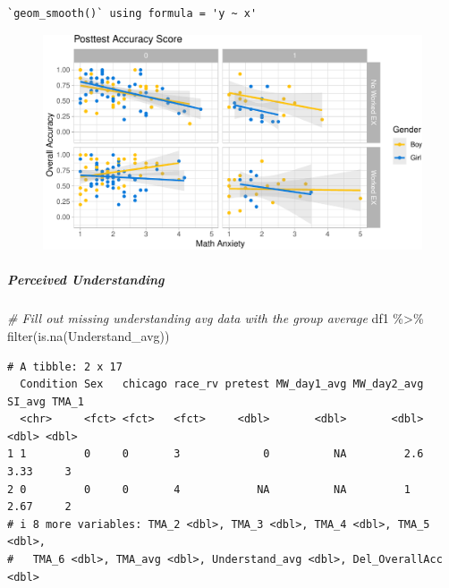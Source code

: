 \documentclass[
  letterpaper,
  DIV=11,
  numbers=noendperiod]{scrartcl}
\let\oldsubparagraph\subparagraph
\renewcommand{\subparagraph}[1]{\oldsubparagraph{#1}\mbox{}}
\newenvironment{Shaded}{\begin{snugshade}}{\end{snugshade}}
\newcommand{\CommentTok}[1]{\textcolor[rgb]{0.38,0.63,0.69}{\textit{#1}}}
\newcommand{\FunctionTok}[1]{\textcolor[rgb]{0.02,0.16,0.49}{#1}}
\newcommand{\NormalTok}[1]{\textcolor[rgb]{0.00,0.44,0.13}{#1}}
\newcommand{\SpecialCharTok}[1]{\textcolor[rgb]{0.25,0.44,0.63}{#1}}
\begin{document}
\begin{verbatim}
`geom_smooth()` using formula = 'y ~ x'
\end{verbatim}

\begin{figure}[H]

{\centering \includegraphics{sampling_files/figure-pdf/unnamed-chunk-18-1.pdf}

}

\end{figure}

\hypertarget{perceived-understanding}{%
\subparagraph{Perceived Understanding}\label{perceived-understanding}}

\begin{Shaded}
\begin{Highlighting}[]
\CommentTok{\# Fill out missing understanding avg data with the group average}
\NormalTok{df1 }\SpecialCharTok{\%\textgreater{}\%} \FunctionTok{filter}\NormalTok{(}\FunctionTok{is.na}\NormalTok{(Understand\_avg))}
\end{Highlighting}
\end{Shaded}

\begin{verbatim}
# A tibble: 2 x 17
  Condition Sex   chicago race_rv pretest MW_day1_avg MW_day2_avg SI_avg TMA_1
  <chr>     <fct> <fct>   <fct>     <dbl>       <dbl>       <dbl>  <dbl> <dbl>
1 1         0     0       3             0          NA         2.6   3.33     3
2 0         0     0       4            NA          NA         1     2.67     2
# i 8 more variables: TMA_2 <dbl>, TMA_3 <dbl>, TMA_4 <dbl>, TMA_5 <dbl>,
#   TMA_6 <dbl>, TMA_avg <dbl>, Understand_avg <dbl>, Del_OverallAcc <dbl>
\end{verbatim}
\end{document}

